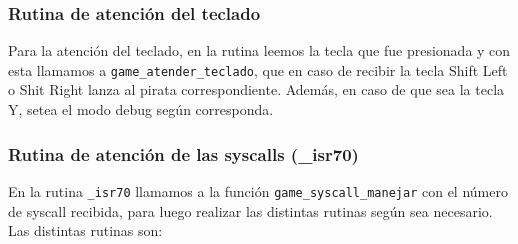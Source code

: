\subsubsection{Rutina de atención del teclado}

Para la atención del teclado, en la rutina leemos la tecla que fue presionada y con esta llamamos a \texttt{game\_atender\_teclado}, que en caso de recibir la tecla Shift Left o Shit Right lanza al pirata correspondiente. Además, en caso de que sea la tecla Y, setea el modo debug según corresponda.

\subsubsection{Rutina de atención de las syscalls (\_isr70)}

En la rutina \texttt{\_isr70} llamamos a la función \texttt{game\_syscall\_manejar} con el número de syscall recibida, para luego realizar las distintas rutinas según sea necesario. Las distintas rutinas son:

